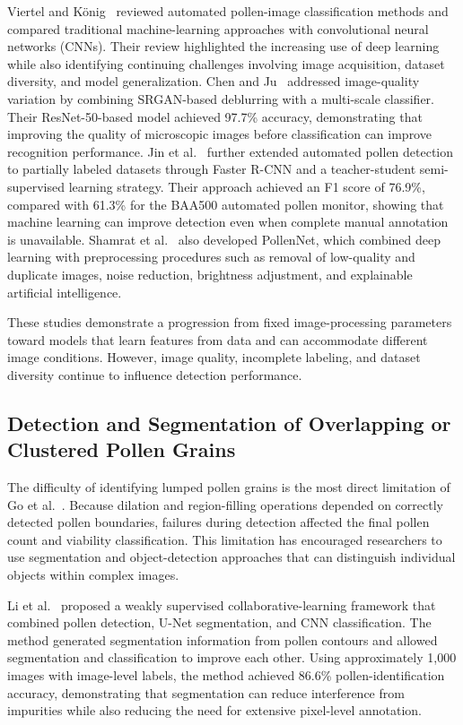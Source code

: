 Viertel and König~\cite{viertel2022} reviewed automated pollen-image classification methods and compared traditional machine-learning approaches with convolutional neural networks (CNNs). Their review highlighted the increasing use of deep learning while also identifying continuing challenges involving image acquisition, dataset diversity, and model generalization. Chen and Ju~\cite{chen2022} addressed image-quality variation by combining SRGAN-based deblurring with a multi-scale classifier. Their ResNet-50-based model achieved 97.7\% accuracy, demonstrating that improving the quality of microscopic images before classification can improve recognition performance. Jin et al.~\cite{jin2023} further extended automated pollen detection to partially labeled datasets through Faster R-CNN and a teacher-student semi-supervised learning strategy. Their approach achieved an F1 score of 76.9\%, compared with 61.3\% for the BAA500 automated pollen monitor, showing that machine learning can improve detection even when complete manual annotation is unavailable. Shamrat et al.~\cite{shamrat2024} also developed PollenNet, which combined deep learning with preprocessing procedures such as removal of low-quality and duplicate images, noise reduction, brightness adjustment, and explainable artificial intelligence.

These studies demonstrate a progression from fixed image-processing parameters toward models that learn features from data and can accommodate different image conditions. However, image quality, incomplete labeling, and dataset diversity continue to influence detection performance.

\subsection{Detection and Segmentation of Overlapping or Clustered Pollen Grains}
\label{sec:rw-overlapping}

The difficulty of identifying lumped pollen grains is the most direct limitation of Go et al.~\cite{go2019}. Because dilation and region-filling operations depended on correctly detected pollen boundaries, failures during detection affected the final pollen count and viability classification. This limitation has encouraged researchers to use segmentation and object-detection approaches that can distinguish individual objects within complex images.

Li et al.~\cite{li2023weakly} proposed a weakly supervised collaborative-learning framework that combined pollen detection, U-Net segmentation, and CNN classification. The method generated segmentation information from pollen contours and allowed segmentation and classification to improve each other. Using approximately 1,000 images with image-level labels, the method achieved 86.6\% pollen-identification accuracy, demonstrating that segmentation can reduce interference from impurities while also reducing the need for extensive pixel-level annotation.

